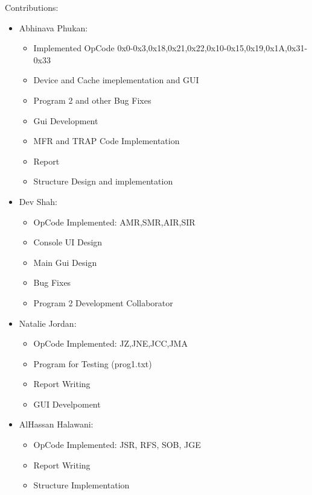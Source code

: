 \documentclass[10pt]{article}
\begin{document}
Contributions:
\begin{itemize}
  \item Abhinava Phukan:
  \begin{itemize}[label=--]
    \item Implemented OpCode 0x0-0x3,0x18,0x21,0x22,0x10-0x15,0x19,0x1A,0x31-0x33
    \item Device and Cache imeplementation and GUI
    \item Program 2 and other Bug Fixes
    \item Gui Development
    \item MFR and TRAP Code Implementation
    \item Report
    \item Structure Design and implementation
  \end{itemize}
  \item Dev Shah:
  \begin{itemize}[label=--]
    \item OpCode Implemented: AMR,SMR,AIR,SIR
    \item Console UI Design
    \item Main Gui Design
    \item Bug Fixes
    \item Program 2 Development Collaborator
  \end{itemize}
  \item Natalie Jordan:
  \begin{itemize}[label=--]
    \item OpCode Implemented: JZ,JNE,JCC,JMA
    \item Program for Testing (prog1.txt)
    \item Report Writing
    \item GUI Develpoment
  \end{itemize}
  \item AlHassan Halawani:
  \begin{itemize}[]
    \item OpCode Implemented: JSR, RFS, SOB, JGE
    \item Report Writing
    \item Structure Implementation
  \end{itemize}
\end{itemize}
\end{document}
